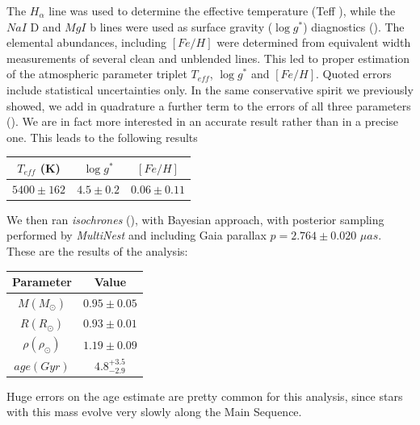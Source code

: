 \documentclass[a4paper,11pt,twocolumn]{article}
\begin{document}
The $H_{\alpha}$ line was used to determine the effective temperature (Teff ),
while the $NaI$ D and $MgI$ b lines were used as surface gravity
($\log{g^*}$) diagnostics (\cite{Anderson}). The elemental abundances, including $[Fe/H]$ 
were determined from equivalent width measurements of several clean and 
unblended lines. This led to proper estimation of the atmospheric parameter 
triplet $T_{eff}$, $\log{g^*}$ and $[Fe/H]$. Quoted errors include statistical 
uncertainties only. In the same conservative spirit we 
previously showed, we add in quadrature a further term to the errors of 
all three parameters (\cite{Sousa}). We are in fact more interested in an 
accurate result rather than in a precise one.
This leads to the following results 
\begin{center}
    \begin{tabular}{ccc}
    \hline
    $T_{eff}$ (K) & $\log{g^*}$ & $[Fe/H]$ \\
    \hline
    $5400 \pm 162$ & $4.5 \pm 0.2$ & $0.06 \pm 0.11$ \\
    \hline
    \end{tabular}
\end{center}
We then ran \textit{isochrones} (\cite{Morton}), with Bayesian approach, 
with posterior sampling performed by \textit{MultiNest} and including Gaia 
parallax $p=2.764 \pm 0.020$ $\mu as$. These are the results of the 
analysis:
\begin{center}
    \begin{tabular}{cc}
    \hline
    Parameter & Value \\
    \hline
     $M (M_{\odot})$ &  $0.95\pm0.05$ \\
     $R (R_{\odot})$ & $0.93 \pm 0.01$  \\
     $\rho (\rho_{\odot})$ & $1.19 \pm 0.09$ \\
     $age (Gyr)$  & $4.8^{+3.5}_{-2.9}$ \\
    \hline
    \end{tabular}
\end{center}
Huge errors on the age estimate are pretty common for this analysis, since 
stars with this mass evolve very slowly along the Main Sequence.

\end{document}
